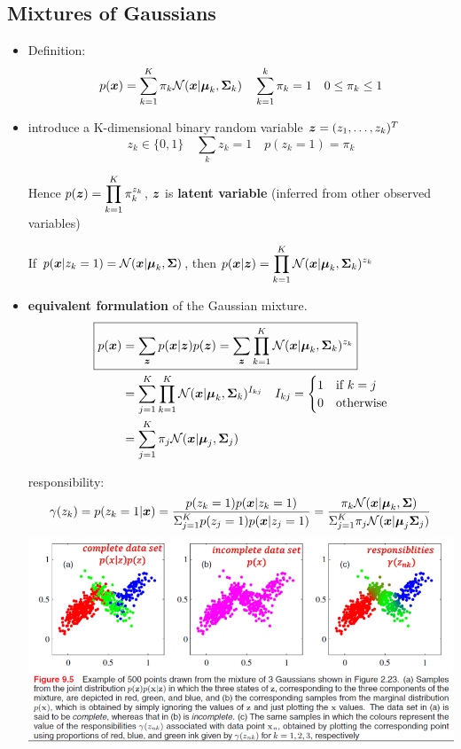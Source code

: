 \documentclass[11pt]{article}
\begin{document}
\subsection{Mixtures of Gaussians}
\label{sec:orga4f5879}
\begin{itemize}
\item Definition: 
\begin{equation*}
p(\boldsymbol{x})=\displaystyle\sum_{k=1}^K\pi_k\mathcal{N}
(\boldsymbol{x}|\boldsymbol{\mu}_k,\boldsymbol{\Sigma}_k)\quad \displaystyle\sum_{k=1}^k\pi_k=1
\quad 0\le\pi_k\le1
\end{equation*}
\item introduce a K-dimensional binary random variable \(\boldsymbol{z}=(z_1,\dots,z_k)^T\)
\begin{equation*}
z_k\in\{0,1\}\quad \displaystyle\sum_kz_k=1\quad p(z_k=1)=\pi_k
\end{equation*}

Hence \(p(\boldsymbol{z})
     =\displaystyle\prod_{k=1}^K\pi_k^{z_k}\), \(\boldsymbol{z}\) is \textbf{latent variable} (inferred
from other observed variables)

If \(p(\boldsymbol{x}|z_k=1)=\mathcal{N}(\boldsymbol{x}|\boldsymbol{\mu}_k,\boldsymbol{\Sigma})\), then
\(p(\boldsymbol{x}|\boldsymbol{z})=\displaystyle\prod_{k=1}^K\mathcal{N}(\boldsymbol{x}|\boldsymbol{\mu}_k,
     \boldsymbol{\Sigma}_k)^{z_k}\)
\item \textbf{equivalent formulation} of the Gaussian mixture.
\begin{align*}
\Aboxed{
p(\bl{x})&=\displaystyle\sum_{\bl{z}}p(\bl{x}|\bl{z})p(\bl{z})
=\displaystyle\sum_{\bl{z}}\displaystyle\prod_{k=1}^K
\mathcal{N}(\bl{x}|\bl{\mu}_k,\bl{\Sigma}_k)^{z_k}}\\
&=\displaystyle\sum_{j=1}^K\displaystyle\prod_{k=1}^K\mathcal{N}(\bl{x}|\bl{\mu}_k,
\bl{\Sigma}_k)^{I_{kj}}\quad I_{kj}=
\begin{cases}
1&\text{if } k=j\\
0&\text{otherwise}
\end{cases}\\
&=\displaystyle\sum_{j=1}^K\pi_j\mathcal{N}(\bl{x}|\bl{\mu}_j,\bl{\Sigma}_j)
\end{align*}

responsibility:
\begin{equation*}
\gamma(z_k)=p(z_k=1|\boldsymbol{x})=\frac{p(z_k=1)p(\boldsymbol{x}|z_k=1)}{\displaystyle\Sigma_{j=1}^Kp(z_j=1)p(\boldsymbol{x}|z_j=1)}
=\frac{ \pi_k\mathcal{N}(\boldsymbol{x}|\boldsymbol{\mu}_k,\boldsymbol{\Sigma})}{\displaystyle\Sigma_{j=1}^K\pi_j\mathcal{N}(\boldsymbol{x}|\boldsymbol{\mu}_j
\boldsymbol{\Sigma}_j)}
\end{equation*}
\includegraphics[width=130mm]{GMM}
\end{itemize}
\end{document}
